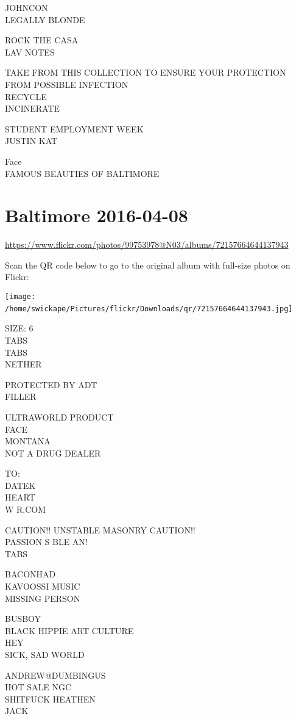 \documentclass[10pt,letterpaper]{article}
\begin{document}
JOHNCON\\
LEGALLY BLONDE

ROCK THE CASA\\
LAV NOTES

TAKE FROM THIS COLLECTION TO ENSURE YOUR PROTECTION FROM POSSIBLE INFECTION\\
RECYCLE\\
INCINERATE

STUDENT EMPLOYMENT WEEK\\
JUSTIN KAT

Face\\
FAMOUS BEAUTIES OF BALTIMORE
\

\section*{Baltimore 2016-04-08}

\url{https://www.flickr.com/photos/99753978@N03/albums/72157664644137943}

Scan the QR code below to go to the original album with full-size photos on Flickr:

\texttt{[image: /home/swickape/Pictures/flickr/Downloads/qr/72157664644137943.jpg]}
\

SIZE: 6\\
TABS\\
TABS\\
NETHER

PROTECTED BY ADT\\
FILLER

ULTRAWORLD PRODUCT\\
FACE\\
MONTANA\\
NOT A DRUG DEALER

TO:\\
DATEK\\
HEART\\
W R.COM

CAUTION!! UNSTABLE MASONRY CAUTION!!\\
PASSION S BLE AN!\\
TABS

BACONHAD\\
KAVOOSSI MUSIC\\
MISSING PERSON

BUSBOY\\
BLACK HIPPIE ART CULTURE\\
HEY\\
SICK, SAD WORLD

ANDREW@DUMBINGUS\\
HOT SALE NGC\\
SHITFUCK HEATHEN\\
JACK
\end{document}
